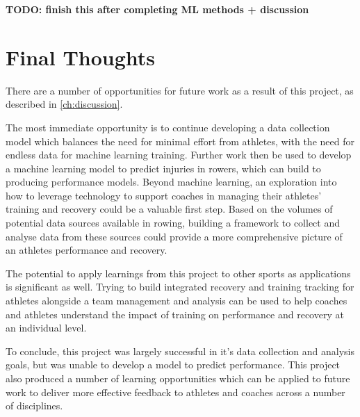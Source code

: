 \textbf{TODO: finish this after completing ML methods + discussion}

\section{Final Thoughts}
There are a number of opportunities for future work as a result of this project, as described in \autoref{ch:discussion}. 

The most immediate opportunity is to continue developing a data collection model which balances the need for minimal effort from athletes, with the need for endless data for machine learning training. Further work then be used to develop a machine learning model to predict injuries in rowers, which can build to producing performance models. Beyond machine learning, an exploration into how to leverage technology to support coaches in managing their athletes' training and recovery could be a valuable first step. Based on the volumes of potential data sources available in rowing, building a framework to collect and analyse data from these sources could provide a more comprehensive picture of an athletes performance and recovery.

The potential to apply learnings from this project to other sports as applications is significant as well. Trying to build integrated recovery and training tracking for athletes alongside a team management and analysis can be used to help coaches and athletes understand the impact of training on performance and recovery at an individual level.

To conclude, this project was largely successful in it's data collection and analysis goals, but was unable to develop a model to predict performance. This project also produced a number of learning opportunities which can be applied to future work to deliver more effective feedback to athletes and coaches across a number of disciplines.